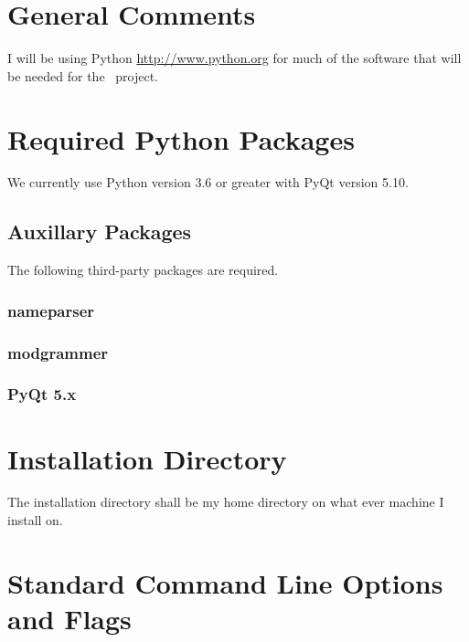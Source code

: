 \section{General Comments}

I will be using Python \url{http://www.python.org} for much of the software
that will be needed for the \ProjectTitle\ project.

\section{Required Python Packages}

We currently use Python version 3.6 or greater with PyQt version 5.10.

\subsection{Auxillary Packages}
The following third-party packages are required.

\subsubsection{nameparser}

\subsubsection{modgrammer}

\subsubsection{PyQt 5.x}

\section{Installation Directory}

The installation directory shall be my home directory on what ever machine
I install on.

\section{Standard Command Line Options and Flags}

